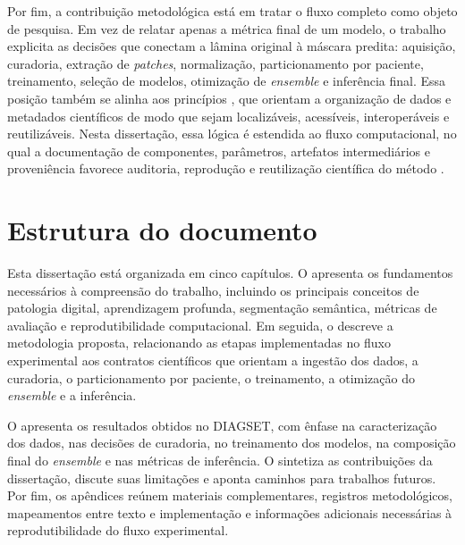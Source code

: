 Por fim, a contribuição metodológica está em tratar o fluxo completo como
objeto de pesquisa. Em vez de relatar apenas a métrica final de um modelo, o
trabalho explicita as decisões que conectam a lâmina original à máscara
predita: aquisição, curadoria, extração de \textit{patches}, normalização,
particionamento por paciente, treinamento, seleção de modelos, otimização de
\textit{ensemble} e inferência final. Essa posição também se alinha aos princípios
,
que orientam a organização de dados e metadados científicos de modo que sejam
localizáveis, acessíveis, interoperáveis e reutilizáveis. Nesta dissertação,
essa lógica é estendida ao fluxo computacional, no qual a documentação de
componentes, parâmetros, artefatos intermediários e proveniência favorece
auditoria, reprodução e reutilização científica do método
\cite{wilkinson2016fair,piccolo2016tools}.

\section{Estrutura do documento}\label{sec:estrutura_documento}

Esta dissertação está organizada em cinco capítulos. O 
apresenta os fundamentos necessários à compreensão do trabalho, incluindo os
principais conceitos de patologia digital, aprendizagem profunda, segmentação
semântica, métricas de avaliação e reprodutibilidade computacional. Em seguida,
o  descreve a metodologia proposta, relacionando
as etapas implementadas no fluxo experimental aos contratos científicos que
orientam a ingestão dos dados, a curadoria, o particionamento por paciente, o
treinamento, a otimização do \textit{ensemble} e a inferência.

O  apresenta os resultados obtidos no DIAGSET, com
ênfase na caracterização dos dados, nas decisões de curadoria, no treinamento
dos modelos, na composição final do \textit{ensemble} e nas métricas de
inferência. O  sintetiza as contribuições da
dissertação, discute suas limitações e aponta caminhos para trabalhos futuros.
Por fim, os apêndices reúnem materiais complementares, registros metodológicos,
mapeamentos entre texto e implementação e informações adicionais necessárias à
reprodutibilidade do fluxo experimental.
